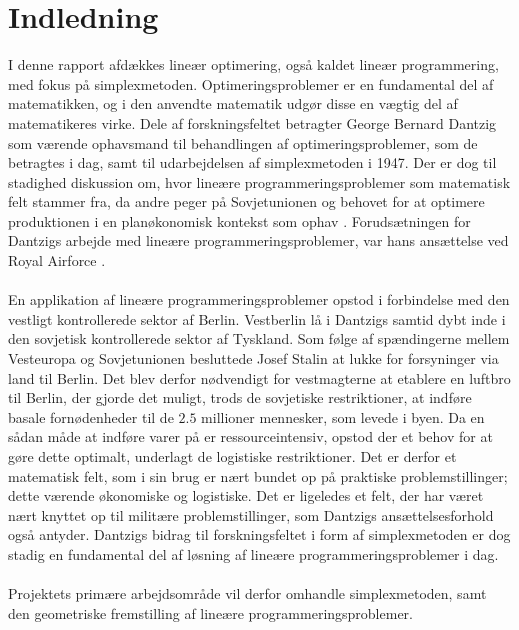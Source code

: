 \chapter*{Indledning}
I denne rapport afdækkes lineær optimering, også kaldet lineær programmering, med fokus på simplexmetoden.
Optimeringsproblemer er en fundamental del af matematikken, og i den anvendte matematik udgør disse en vægtig del af matematikeres virke. 
Dele af forskningsfeltet betragter George Bernard Dantzig som værende  ophavsmand til behandlingen af optimeringsproblemer, som de betragtes i dag, samt til udarbejdelsen af simplexmetoden \citep[side 107]{refa} i 1947.
Der er dog til stadighed diskussion om, hvor lineære programmeringsproblemer som matematisk felt stammer fra, da andre peger på Sovjetunionen og behovet for at optimere produktionen i en planøkonomisk kontekst som ophav \citep[side 155]{refb}.
Forudsætningen for Dantzigs arbejde med lineære programmeringsproblemer, var hans ansættelse ved Royal Airforce \citep[side 107]{refa}.\\\\
%
En applikation af lineære programmeringsproblemer opstod i forbindelse med den vestligt kontrollerede sektor af Berlin.
Vestberlin lå i Dantzigs samtid dybt inde i den sovjetisk kontrollerede sektor af Tyskland. 
Som følge af spændingerne mellem Vesteuropa og Sovjetunionen besluttede Josef Stalin at lukke for forsyninger via land til Berlin.
Det blev derfor nødvendigt for vestmagterne at etablere en luftbro til Berlin, der gjorde det muligt, trods de sovjetiske restriktioner, at indføre basale fornødenheder til de $2.5$ millioner mennesker, som levede i byen.
Da en sådan måde at indføre varer på er ressourceintensiv, opstod der et behov for at gøre dette optimalt, underlagt de logistiske restriktioner.
Det er derfor et matematisk felt, som i sin brug er nært bundet op på praktiske problemstillinger; dette værende økonomiske og logistiske.
Det er ligeledes et felt, der har været nært knyttet op til militære problemstillinger, som Dantzigs ansættelsesforhold også antyder.
Dantzigs bidrag til forskningsfeltet i form af simplexmetoden er dog stadig en fundamental del af løsning af lineære programmeringsproblemer i dag.
\\\\
Projektets primære arbejdsområde vil derfor omhandle simplexmetoden, samt den geometriske fremstilling af lineære programmeringsproblemer.
